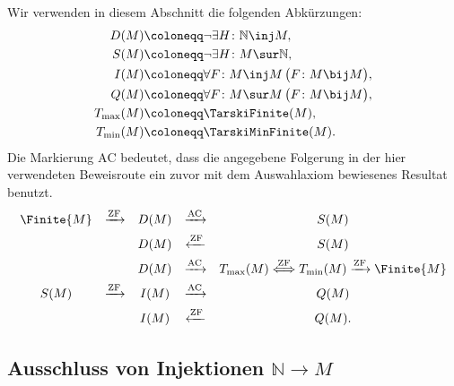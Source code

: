 \documentclass[main.tex]{subfiles}
\begin{document}
Wir verwenden in diesem Abschnitt die folgenden Abkürzungen:
\[
\begin{aligned}
D(M)&\coloneqq \neg\exists H\colon \mathbb{N}\inj M,\\
S(M)&\coloneqq \neg\exists H\colon M\sur\mathbb{N},\\
I(M)&\coloneqq \forall F\colon M\inj M\,\bigl(F\colon M\bij M\bigr),\\
Q(M)&\coloneqq \forall F\colon M\sur M\,\bigl(F\colon M\bij M\bigr),\\
T_{\max}(M)&\coloneqq \TarskiFinite(M),\\
T_{\min}(M)&\coloneqq \TarskiMinFinite(M).
\end{aligned}
\]
Die Markierung \(\mathrm{AC}\) bedeutet, dass die angegebene Folgerung in
der hier verwendeten Beweisroute ein zuvor mit dem Auswahlaxiom bewiesenes
Resultat benutzt.
\[
\begin{array}{ccccc}
\Finite{M} & \xrightarrow{\mathrm{ZF}} & D(M)
  & \xrightarrow{\mathrm{AC}} & S(M)\\[1.1ex]
&& D(M) & \xleftarrow{\mathrm{ZF}} & S(M)\\[1.1ex]
&& D(M) & \xrightarrow{\mathrm{AC}} &
  T_{\max}(M)\overset{\mathrm{ZF}}{\Longleftrightarrow}
  T_{\min}(M)\xrightarrow{\mathrm{ZF}}\Finite{M}\\[1.1ex]
S(M) & \xrightarrow{\mathrm{ZF}} & I(M)
  & \xrightarrow{\mathrm{AC}} & Q(M)\\[1.1ex]
&& I(M) & \xleftarrow{\mathrm{ZF}} & Q(M).
\end{array}
\]

\subsection[Ausschluss von Injektionen N -> M]{%
  Ausschluss von Injektionen \(\mathbb{N}\to M\)}
\end{document}
